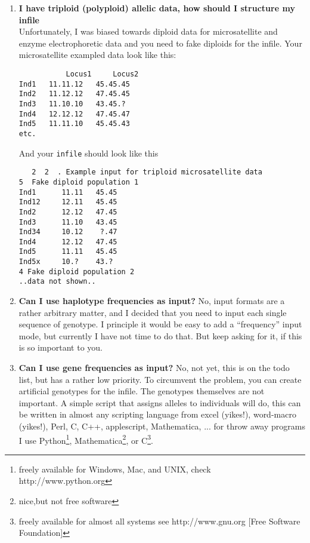 \begin{enumerate}
\item {\bf I have triploid (polyploid) allelic data, how should I structure my infile}\\
Unfortunately, I was biased towards diploid data for microsatellite and 
enzyme electrophoretic data and you need to fake diploids for the infile.
Your microsatellite exampled data look like this:
\begin{tt}
\begin{verbatim}
           Locus1     Locus2
Ind1   11.11.12   45.45.45  
Ind2   11.12.12   47.45.45  
Ind3   11.10.10   43.45.?     
Ind4   12.12.12   47.45.47  
Ind5   11.11.10   45.45.43  
etc.
\end{verbatim}
\end{tt}
And your {\tt infile} should look like this
\begin{tt}
\begin{verbatim}
   2  2  . Example input for triploid microsatellite data
5  Fake diploid population 1
Ind1      11.11   45.45
Ind12     12.11   45.45
Ind2      12.12   47.45 
Ind3      11.10   43.45     
Ind34     10.12    ?.47
Ind4      12.12   47.45  
Ind5      11.11   45.45  
Ind5x     10.?    43.?
4 Fake diploid population 2
..data not shown..
\end{verbatim}
\end{tt}

\item{\bf Can I use haplotype frequencies as input?}
No, input formats are a rather arbitrary matter, and I decided that
you need to input each single sequence of genotype. I principle it
would be easy to add a ``frequency'' input mode, but currently
I have not time to do that. But keep asking for it, if this is so
important to you.
\item{\bf Can I use gene frequencies as input?}
No, not yet, this is on the todo list, but has a rather low
priority. To circumvent the problem, you can create artificial 
genotypes for the infile. The genotypes themselves are not important.
A simple script that assigns alleles to individuals will do, this
can be written in almost any scripting language from excel (yikes!),
word-macro (yikes!), Perl, C, C++, applescript, Mathematica, ... for throw away programs I use Python\footnote{freely available for Windows, Mac, and UNIX, check http://www.python.org}, Mathematica\footnote{nice,but not free software},  or C\footnote{freely available for almost all systems see http://www.gnu.org [Free Software Foundation]}.
\end{enumerate}

